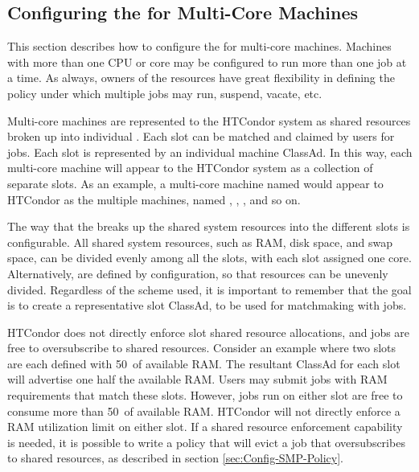 \subsection{\label{sec:Configuring-SMP}
Configuring the  for Multi-Core Machines}

This section describes how to configure the  for multi-core
machines.
Machines with more than one CPU or core may
be configured to run more than one job at a time.
As always, owners of the resources have great flexibility in defining
the policy under which multiple jobs may run, suspend, vacate, etc.  

Multi-core machines are represented to the HTCondor system as
shared resources broken up into individual .
Each slot can be matched and claimed by users for jobs.
Each slot is represented by an individual machine ClassAd.
In this way, each multi-core machine will appear to the HTCondor system as
a collection of separate slots.  
As an example, a multi-core machine named
 would appear to HTCondor as the
multiple machines, named ,
,
, and so on.

The way that the  breaks up the
shared system resources into the different slots
is configurable.
All shared system resources, such as RAM, disk space, and swap space,
can be divided evenly among all the slots, with each
slot assigned one core.
Alternatively, 
 are defined by configuration, 
so that resources can be unevenly divided.
Regardless of the scheme used, it is important
to remember that the goal is to create a representative slot ClassAd,
to be used for matchmaking with jobs.

HTCondor does not
directly enforce slot shared resource allocations, and jobs
are free to oversubscribe to shared resources.
Consider an example where two slots are each defined with 50\Percent\ of
available RAM.  The resultant ClassAd for each slot will advertise one
half the available RAM.  Users may submit jobs with RAM requirements
that match these slots.  However, jobs run on either slot are free to
consume more than 50\Percent\ of available RAM.  HTCondor will not
directly enforce a RAM utilization limit on either slot.  If a shared
resource enforcement capability is needed, 
it is possible to write a
policy that will evict a job that oversubscribes to shared
resources, as described in section \ref{sec:Config-SMP-Policy}.

